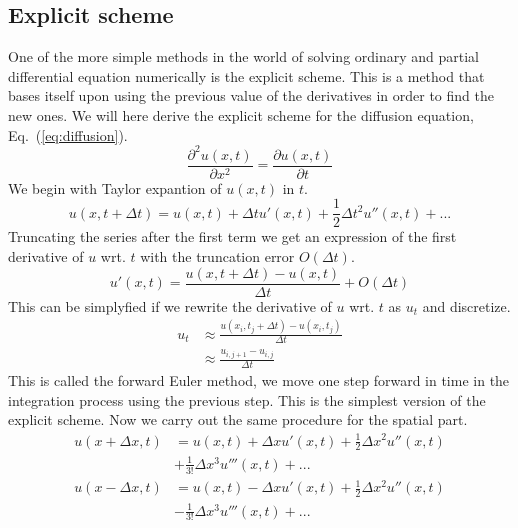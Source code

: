 \documentclass[a4paper, twocolumn]{article}
\newcommand{\eq} [1]{Eq.\ (\ref{eq:#1})}
\begin{document}
\subsection{Explicit scheme}
One of the more simple methods in the world of solving ordinary and partial differential equation numerically is the explicit scheme. This is a method that bases itself upon using the previous value of the derivatives in order to find the new ones.
We will here derive the explicit scheme for the diffusion equation, \eq{diffusion}.
\begin{equation} \label{eq:diffusion}
\frac{\partial^2 u(x,t)}{\partial x^2} = \frac{\partial u(x,t)}{\partial t}
\end{equation}
We begin with Taylor expantion of $u(x,t)$ in $t$. 
\begin{equation*}
u(x,t + \Delta t) = u(x,t) + \Delta t u'(x,t) + \frac{1}{2} \Delta t^2 u''(x,t) + ...
\end{equation*}
Truncating the series after the first term we get an expression of the first derivative of $u$ wrt. $t$ with the truncation error $O(\Delta t)$.
\begin{equation*}
u'(x,t) = \frac{u(x,t + \Delta t) - u(x,t)}{\Delta t} + O(\Delta t)
\end{equation*}
This can be simplyfied if we rewrite the derivative of $u$ wrt. $t$ as $u_t$ and discretize.
\begin{align*}
u_t &\approx \frac{u(x_i, t_j + \Delta t) - u(x_i, t_j)}{\Delta t} \\
&\approx \frac{u_{i,j+1} - u_{i,j}}{\Delta t}
\end{align*}
This is called the forward Euler method, we move one step forward in time in the integration process using the previous step. This is the simplest version of the explicit scheme.
Now we carry out the same procedure for the spatial part.
\begin{align*}
u(x + \Delta x,t) &= u(x,t) + \Delta x u'(x,t) + \frac{1}{2} \Delta x^2 u''(x,t) \\
&+ \frac{1}{3!} \Delta x^3 u'''(x,t) + ... \\
u(x - \Delta x,t) &= u(x,t) - \Delta x u'(x,t) + \frac{1}{2} \Delta x^2 u''(x,t) \\
&- \frac{1}{3!} \Delta x^3 u'''(x,t) + ... 
\end{align*}
\end{document}

